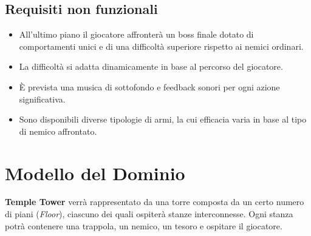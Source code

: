 \documentclass[a4paper,12pt]{report}
\begin{document}
\subsection*{Requisiti non funzionali}
\begin{itemize}
	\item All'ultimo piano il giocatore affronterà un boss finale dotato di comportamenti unici e di una difficoltà superiore rispetto ai nemici ordinari.
	\item La difficoltà si adatta dinamicamente in base al percorso del giocatore.
	\item È prevista una musica di sottofondo e feedback sonori per ogni azione significativa.
	\item Sono disponibili diverse tipologie di armi, la cui efficacia varia in base al tipo di nemico affrontato.
\end{itemize}

\section{Modello del Dominio}
\textbf{Temple Tower} verrà rappresentato da una torre composta da un certo numero di piani (\textit{Floor}), 
%
ciascuno dei quali ospiterà stanze interconnesse. Ogni stanza potrà contenere una trappola, un nemico, un tesoro e ospitare il giocatore.
\end{document}
